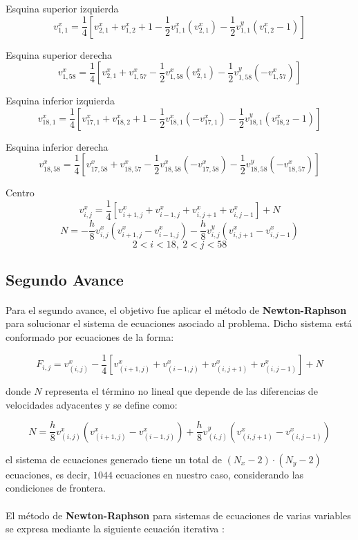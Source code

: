 \documentclass{article}
\begin{document}
  Esquina superior izquierda
  \[v_{1,1}^x=\frac{1}{4}[v_{2,1}^x+v_{1,2}^x+1-\frac{1}{2}v_{1,1}^x(v_{2,1}^x)-\frac{1}{2}v_{1,1}^y(v_{1,2}^x-1)]\]

  Esquina superior derecha
  \[v_{1,58}^x=\frac{1}{4}[v_{2,1}^x+v_{1,57}^x-\frac{1}{2}v_{1,58}^x(v_{2,1}^x)-\frac{1}{2}v_{1,58}^y(-v_{1,57}^x)]\]

  Esquina inferior izquierda
  \[v_{18,1}^x=\frac{1}{4}[v_{17,1}^x+v_{18,2}^x+1-\frac{1}{2}v_{18,1}^x(-v_{17,1}^x)-\frac{1}{2}v_{18,1}^y(v_{18,2}^x-1)]\]

  Esquina inferior derecha
  \[v_{18,58}^x=\frac{1}{4}[v_{17,58}^x+v_{18,57}^x-\frac{1}{2}v_{18,58}^x(-v_{17,58}^x)-\frac{1}{2}v_{18,58}^y(-v_{18,57}^x)]\]

  Centro
  \[v_{i,j}^x=\frac{1}{4}[v_{i+1,j}^x+v_{i-1,j}^x+v_{i,j+1}^x+v_{i,j-1}^x]+N\]
  \[N=-\frac{h}{8}v_{i,j}^x(v_{i+1,j}^x-v_{i-1,j}^x)-\frac{h}{8}v_{i,j}^y(v_{i,j+1}^x-v_{i,j-1}^x)\]
  \[2<i<18, \ 2<j<58\]

  \subsection*{Segundo Avance}
  \paragraph{}
  Para el segundo avance, el objetivo fue aplicar el método de \textbf{Newton-Raphson} para solucionar el sistema de ecuaciones asociado al problema. Dicho sistema está conformado por ecuaciones de la forma:

  \[
  F_{i,j} = v_{(i,j)}^x - \frac{1}{4} \left[v_{(i+1,j)}^x + v_{(i-1,j)}^x + v_{(i,j+1)}^x + v_{(i,j-1)}^x \right] + N
  \]

  donde \(N\) representa el término no lineal que depende de las diferencias de velocidades adyacentes y se define como:

  \[
  N = \frac{h}{8}v_{(i,j)}^x \left(v_{(i+1,j)}^x - v_{(i-1,j)}^x \right) + \frac{h}{8}v_{(i,j)}^y \left(v_{(i,j+1)}^x - v_{(i,j-1)}^x \right)
  \]

  el sistema de ecuaciones generado tiene un total de \((N_x - 2) \cdot (N_y - 2)\) ecuaciones, es decir, \(1044\) ecuaciones en nuestro caso, considerando las condiciones de frontera.

  \paragraph{}
  El método de \textbf{Newton-Raphson} para sistemas de ecuaciones de varias variables se expresa mediante la siguiente ecuación iterativa \cite{kincaid1}:
\end{document}
